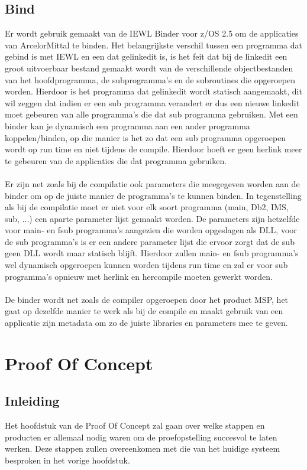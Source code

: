 \section{Bind}
\label{sec:bind}
Er wordt gebruik gemaakt van de IEWL Binder voor z/OS 2.5 om de applicaties van ArcelorMittal te binden. Het belangrijkste verschil tussen een programma dat gebind is met IEWL en een dat gelinkedit is, is het feit dat bij de linkedit een groot uitvoerbaar bestand gemaakt wordt van de verschillende objectbestanden van het hoofdprogramma, de subprogramma's en de subroutines die opgeroepen worden. Hierdoor is het programma dat gelinkedit wordt statisch aangemaakt, dit wil zeggen dat indien er een sub programma verandert er dus een nieuwe linkedit moet gebeuren van alle programma's die dat sub programma gebruiken. Met een binder kan je dynamisch een programma aan een ander programma koppelen/binden, op die manier is het zo dat een sub programma opgeroepen wordt op run time en niet tijdens de compile. Hierdoor hoeft er geen herlink meer te gebeuren van de applicaties die dat programma gebruiken. 
\\ \\
Er zijn net zoals bij de compilatie ook parameters die meegegeven worden aan de binder om op de juiste manier de programma's te kunnen binden. In tegenstelling als bij de compilatie moet er niet voor elk soort programma (main, Db2, IMS, sub, ...) een aparte parameter lijst gemaakt worden. De parameters zijn hetzelfde voor main- en fsub programma's aangezien die worden opgeslagen als DLL, voor de sub programma's is er een andere parameter lijst die ervoor zorgt dat de sub geen DLL wordt maar statisch blijft. Hierdoor zullen main- en fsub programma's wel dynamisch opgeroepen kunnen worden tijdens run time en zal er voor sub programma's opnieuw met herlink en hercompile moeten gewerkt worden. 
\\ \\ 
De binder wordt net zoals de compiler opgeroepen door het product MSP, het gaat op dezelfde manier te werk als bij de compile en maakt gebruik van een applicatie zijn metadata om zo de juiste libraries en parameters mee te geven.

\chapter{Proof Of Concept}
\label{ch:poc}

\section{Inleiding}
\label{sec:inleiding_poc}
Het hoofdstuk van de Proof Of Concept zal gaan over welke stappen en producten er allemaal nodig waren om de proefopstelling succesvol te laten werken. Deze stappen zullen overeenkomen met die van het huidige systeem besproken in het vorige hoofdstuk.
\\ \\

